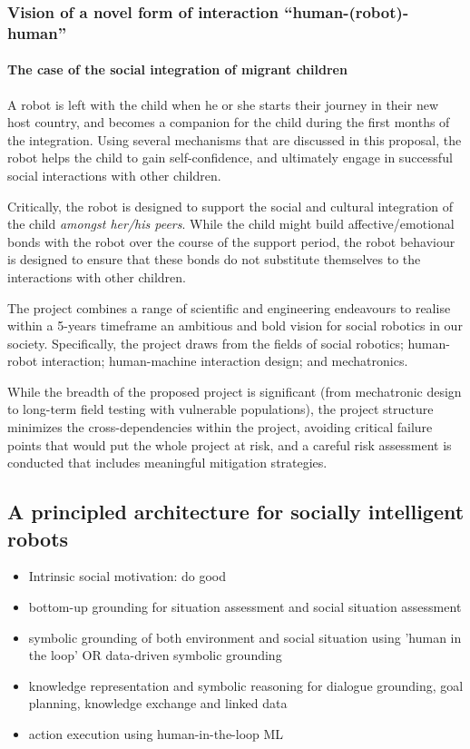 \documentclass[]{article}
\begin{document}
\subsubsection{Vision of a novel form of interaction ``human-(robot)-human''}

\paragraph{The case of the social integration of migrant children}

A robot is left with the child when he or she starts their journey in
their new host country, and becomes a companion for the child during the
first months of the integration. Using several mechanisms that are
discussed in this proposal, the robot helps the child to gain
self-confidence, and ultimately engage in successful social interactions
with other children.

Critically, the robot is designed to support the social and cultural
integration of the child \emph{amongst her/his peers}. While the child
might build affective/emotional bonds with the robot over the course of
the support period, the robot behaviour is designed to ensure that these
bonds do not substitute themselves to the interactions with other
children.

The project combines a range of scientific and engineering endeavours to
realise within a 5-years timeframe an ambitious and bold vision for
social robotics in our society. Specifically, the project draws from the
fields of social robotics; human-robot interaction; human-machine
interaction design; and mechatronics.

While the breadth of the proposed project is significant (from
mechatronic design to long-term field testing with vulnerable
populations), the project structure minimizes the cross-dependencies
within the project, avoiding critical failure points that would put the
whole project at risk, and a careful risk assessment is conducted that
includes meaningful mitigation strategies.




\subsection{A principled architecture for socially intelligent robots}


\begin{itemize}
    \item Intrinsic social motivation: do good
    \item bottom-up grounding for situation assessment and social situation
        assessment
    \item symbolic grounding of both environment and social situation using
        'human in the loop' OR data-driven symbolic grounding
    \item knowledge representation and symbolic reasoning for dialogue
        grounding, goal planning, knowledge exchange and linked data
    \item action execution using human-in-the-loop ML
\end{itemize}
\end{document}
